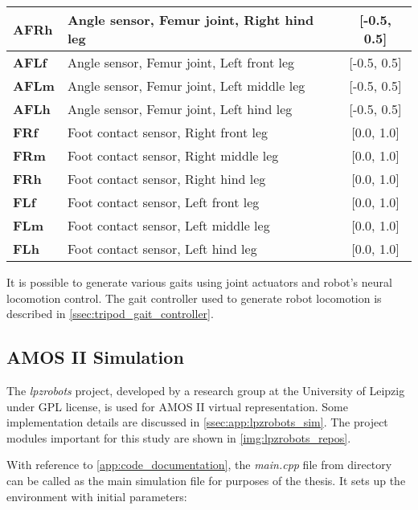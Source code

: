 \begin{table}[H]
\begin{tabular}{|l|l|c|}
\textbf{AFRh}         & Angle sensor, Femur joint, Right hind leg        & {[}-0.5, 0.5{]}         \\ \hline
\textbf{AFLf}         & Angle sensor, Femur joint, Left front leg        & {[}-0.5, 0.5{]}         \\ \hline
\textbf{AFLm}         & Angle sensor, Femur joint, Left middle leg       & {[}-0.5, 0.5{]}         \\ \hline
\textbf{AFLh}         & Angle sensor, Femur joint, Left hind leg         & {[}-0.5, 0.5{]}         \\ \hline
\textbf{FRf}          & Foot contact sensor, Right front leg             & {[}0.0, 1.0{]}          \\ \hline
\textbf{FRm}          & Foot contact sensor, Right middle leg            & {[}0.0, 1.0{]}          \\ \hline
\textbf{FRh}          & Foot contact sensor, Right hind leg              & {[}0.0, 1.0{]}          \\ \hline
\textbf{FLf}          & Foot contact sensor, Left front leg              & {[}0.0, 1.0{]}          \\ \hline
\textbf{FLm}          & Foot contact sensor, Left middle leg             & {[}0.0, 1.0{]}          \\ \hline
\textbf{FLh}          & Foot contact sensor, Left hind leg               & {[}0.0, 1.0{]}          \\ \hline
\end{tabular}
\end{table}

It is possible to generate various gaits using joint actuators and robot's neural locomotion control. The gait controller used to generate robot locomotion is described in \cref{ssec:tripod_gait_controller}.

\subsection{AMOS II Simulation} \label{ssec:amosii_sim}
The \textit{lpzrobots} project, developed by a research group at the University of Leipzig \citep{misc:lpzrobots} under GPL license, is used for AMOS II virtual representation. Some implementation details are discussed in \cref{ssec:app:lpzrobots_sim}. The project modules important for this study are shown in \cref{img:lpzrobots_repos}.

With reference to \cref{app:code_documentation}, the \textit{main.cpp} file from  directory can be called as the main simulation file for purposes of the thesis. It sets up the environment with initial parameters:

